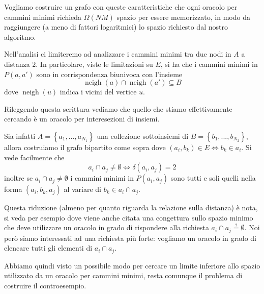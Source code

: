 \documentclass[a4paper,10pt]{amsbook}
\theoremstyle{plain}
\theoremstyle{definition}
\theoremstyle{remark}
\newcommand{\set}[1]{\left\{#1\right\}}
\newcommand{\pa}[1]{\left(#1\right)}
\DeclareMathOperator{\neigh}{neigh}
\begin{document}
Vogliamo costruire un grafo con queste caratteristiche che ogni
oracolo per cammini minimi richieda $\Omega \pa{ NM }$ spazio per
essere memorizzato, in modo da raggiungere (a meno di fattori
logaritmici) lo spazio richiesto dal nostro algoritmo.

Nell'analisi ci limiteremo ad analizzare i cammini minimi tra due nodi
in $A$ a distanza $2$. In particolare, viste le limitazioni su $E$, si
ha che i cammini minimi in $P(a,a')$ sono in corrispondenza biunivoca
con l'insieme
\[ \neigh(a) \cap \neigh(a') \subseteq B \]
dove $\neigh(u)$ indica i vicini del vertice $u$.

Rileggendo questa scrittura vediamo che quello che stiamo
effettivamente cercando \`e un oracolo per interesezioni di insiemi.

Sia infatti $A = \set{ a_1,...,a_{N_1}}$ una collezione sottoinsiemi
di $B = \set{ b_1,...,b_{N_2} }$, allora costruiamo il grafo bipartito
come sopra dove $(a_i,b_k) \in E \Leftrightarrow b_k \in a_i$. Si vede
facilmente che
\[ a_i \cap a_j \neq \emptyset \Leftrightarrow \delta\pa{ a_i , a_j }
= 2 \] inoltre se $a_i \cap a_j \neq \emptyset$ i cammini minimi in
$P\pa{ a_i, a_j}$ sono tutti e soli quelli nella forma $\pa{a_i, b_k,
  a_j}$ al variare di $b_k \in a_i \cap a_j$.

Questa riduzione (almeno per quanto riguarda la relazione sulla
distanza) \`e nota, si veda per esempio \cite{distanceintersection}
dove viene anche citata una congettura sullo spazio minimo che deve
utilizzare un oracolo in grado di rispondere alla richiesta $a_i \cap
a_j \stackrel{?}{=} \emptyset$. Noi per\`o siamo interessati ad una
richiesta pi\`u forte: vogliamo un oracolo in grado di elencare tutti
gli elementi di $a_i \cap a_j$.

Abbiamo quindi visto un possibile modo per cercare un limite inferiore
allo spazio utilizzato da un oracolo per cammini minimi, resta
comunque il problema di costruire il controesempio.





\end{document}
